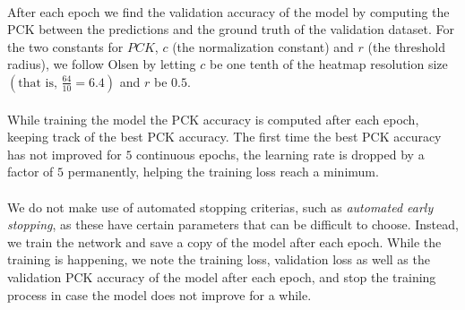\documentclass[./main.tex]{subfiles}
\begin{document}
\\
After each epoch we find the validation accuracy of the model by computing the PCK between the predictions and the ground truth of the validation dataset.  For the two constants for $PCK$, $c$ (the normalization constant) and $r$ (the threshold radius), we follow Olsen \cite{Camilla} by letting $c$ be one tenth of the heatmap resolution size $\left(\text{that is, }\frac{64}{10} = 6.4 \right)$ and $r$ be $0.5$.
\\
\\
While training the model the PCK accuracy is computed after each epoch, keeping track of the best PCK accuracy. The first time the best PCK accuracy has not improved for $5$ continuous epochs, the learning rate is dropped by a factor of $5$ permanently, helping the training loss reach a minimum.
\\
\\
We do not make use of automated stopping criterias, such as \textit{automated early stopping}, as these have certain parameters that can be difficult to choose. Instead, we train the network and save a copy of the model after each epoch. While the training is happening, we note the training loss, validation loss as well as the validation PCK accuracy of the model after each epoch, and stop the training process in case the model does not improve for a while.
\end{document}
